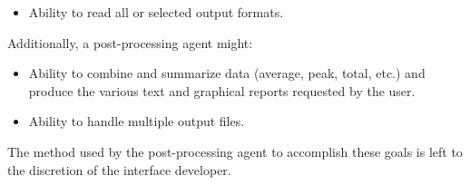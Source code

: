\begin{itemize}
\tightlist
\item
  Ability to read all or selected output formats.
\end{itemize}

Additionally, a post-processing agent might:

\begin{itemize}
\item
  Ability to combine and summarize data (average, peak, total, etc.) and produce the various text and graphical reports requested by the user.
\item
  Ability to handle multiple output files.
\end{itemize}

The method used by the post-processing agent to accomplish these goals is left to the discretion of the interface developer.
